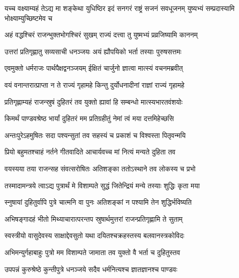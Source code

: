 \threelineshloka
{यच्च वक्ष्याम्यहं तेऽद्य मा शङ्केथा युधिष्ठिर}
{इदं सनगरं राष्ट्रं सजनं सवधूजनम्}
{युष्यभ्यं सम्प्रदास्यामि भोक्ष्याम्युच्छिष्टमेव च}


\twolineshloka
{अहं वद्धश्चिरं राजन्भुक्तभोगश्चिरं सुखम्}
{राज्यं दत्त्वा तु युष्मभ्यं प्रव्रजिष्यामि काननम्}


\twolineshloka
{उत्तरां प्रतिगृह्णातु सव्यसाची धनञ्जयः}
{अयं ह्यौपयिको भर्ता तस्याः पुरुषसत्तमः}



\twolineshloka
{एवमुक्तो धर्मराजः पार्थपैक्षद्वनञ्जयम्}
{ईक्षितं चार्जुनो ज्ञात्वा मात्स्यं वचनमब्रवीत्}


\twolineshloka
{वयं वनान्तरात्प्राप्ता न ते राज्यं गृहामहे}
{किन्तु दुर्योधनादीनां राज्ञां राज्यं गृहामहे}


\twolineshloka
{प्रतिगृह्णाम्यहं राजन्स्रुषं दुहितरं तव}
{युक्तो ह्यावां हि सम्बन्धो मात्स्यभारतवंशयोः}




\twolineshloka
{किमर्थं पाण्डवश्रेष्ठ भार्यां दुहितरं मम}
{प्रतिग्रहीतुं नेमां त्वं मया दत्तमिहेच्छसि}




\twolineshloka
{अन्तःपुरेऽहमुषितः सदा पश्यन्सुतां तव}
{सहस्यं च प्रकाशं च विश्वस्ता पितृवन्मयि}


\twolineshloka
{प्रियो बहुमतश्चाहं नर्तने गीतवादिते}
{आचार्यवच्च मां नित्यं मन्यते दुहिता तव}


\twolineshloka
{वयस्यया तया राजन्सह संवत्सरोषितः}
{अतिशङ्का ततोऽस्थाने तव लोकस्य च प्रभो}


\twolineshloka
{तस्मादामन्त्रये त्वाऽद्य पुत्रार्थं मे विशाम्पते}
{सुद्धं जितेन्द्रियं मन्ये तस्याः शुद्धिः कृता मया}


\twolineshloka
{स्नुषायां दुहितुर्वापि पुत्रे चात्मनि वा पुनः}
{अतिशङ्कां न पश्यामि तेन शुद्धिर्भविष्यति}


\twolineshloka
{अभिषङ्गादहं भीतो मिथ्याचारात्परन्तप}
{स्रुषार्थमुत्तरां राजन्प्रतिगृह्णामि ते सुताम्}


\twolineshloka
{स्वस्त्रीयो वासुदेवस्य साक्षाद्देवसुतो यथा}
{दयितश्चक्रहस्तस्य बलवानस्त्रकोविदः}


\twolineshloka
{अभिमन्युर्गहाबाहुः पुत्रो मम विशाम्पते}
{जामाता तव युक्तो वै भर्ता च दुहितुस्तव}




\twolineshloka
{उपपन्नं कुरुश्रेष्ठे कुन्तीपुत्रे धनञ्जये}
{सदैव धर्मनित्यश्च ज्ञातज्ञानश्च पाण्डवः}


